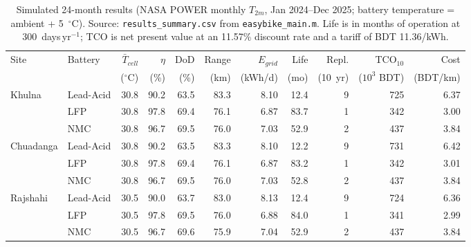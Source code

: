 \begin{table}[t]
\centering\small
\caption{Simulated 24-month results (NASA POWER monthly $T_{2m}$, Jan 2024--Dec 2025; battery temperature = ambient + 5~$^\circ$C). Source: \texttt{results\_summary.csv} from \texttt{easybike\_main.m}. Life is in months of operation at 300~days\,yr$^{-1}$; TCO is net present value at an 11.57\% discount rate and a tariff of BDT 11.36/kWh.}
\label{tab:results}
\begin{tabular}{llrrrrrrrrr}
\toprule
Site & Battery & $\bar T_{cell}$ & $\eta$ & DoD & Range & $E_{grid}$ & Life & Repl. & TCO$_{10}$ & Cost \\
 & & ($^\circ$C) & (\%) & (\%) & (km) & (kWh/d) & (mo) & (10~yr) & ($10^3$ BDT) & (BDT/km) \\
\midrule
Khulna & Lead-Acid & 30.8 & 90.2 & 63.5 & 83.3 & 8.10 & 12.4 & 9 & 725 & 6.37 \\
 & LFP & 30.8 & 97.8 & 69.4 & 76.1 & 6.87 & 83.7 & 1 & 342 & 3.00 \\
 & NMC & 30.8 & 96.7 & 69.5 & 76.0 & 7.03 & 52.9 & 2 & 437 & 3.84 \\
\midrule
Chuadanga & Lead-Acid & 30.8 & 90.2 & 63.5 & 83.3 & 8.10 & 12.2 & 9 & 731 & 6.42 \\
 & LFP & 30.8 & 97.8 & 69.4 & 76.1 & 6.87 & 83.2 & 1 & 342 & 3.01 \\
 & NMC & 30.8 & 96.7 & 69.5 & 76.0 & 7.03 & 52.8 & 2 & 437 & 3.84 \\
\midrule
Rajshahi & Lead-Acid & 30.5 & 90.0 & 63.7 & 83.0 & 8.13 & 12.4 & 9 & 724 & 6.36 \\
 & LFP & 30.5 & 97.8 & 69.5 & 76.0 & 6.88 & 84.0 & 1 & 341 & 2.99 \\
 & NMC & 30.5 & 96.7 & 69.6 & 75.9 & 7.04 & 52.9 & 2 & 437 & 3.84 \\
\bottomrule
\end{tabular}
\end{table}
